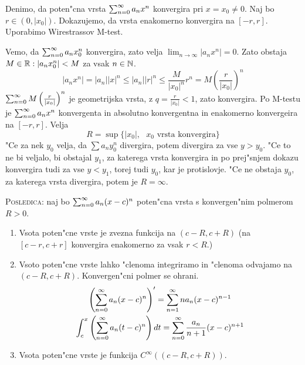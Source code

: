 Denimo, da poten"cna vrsta $\sum_{n = 0}^{\infty} a_n x^n$ konvergira pri $x = x_0 \neq 0$. Naj bo $r \in (0, |x_0|)$. Dokazujemo, da vrsta enakomerno konvergira na $[-r, r]$. Uporabimo Wirestrassov M-test.

Vemo, da $\sum_{n = 0}^{\infty}a_n x_0^n$ konvergira, zato velja $\lim_{n \to \infty} |a_n x^n| = 0$. Zato obstaja $M \in \mathbb{R}: |a_n x_0^n| < M$ za vsak $n \in \mathbb{N}$.
\begin{equation*}
|a_n x^n| = |a_n| |x|^n \leq |a_n| |r|^n \leq \dfrac{M}{|x_0|^n} r^n = M \left( \dfrac{r}{|x_0|} \right)^n
\end{equation*}
$\sum_{n = 0}^{\infty} M \left( \frac{r}{|x_0|} \right)^n$ je geometrijska vrsta, z $q = \frac{r}{|x_0|} < 1$, zato konvergira. Po M-testu je $\sum_{n = 0}^{\infty} a_n x^n$ konvergenta in absolutno konvergentna in enakomerno konvergeira na $[-r, r]$. Velja
\begin{equation*}
R = \sup \{ |x_0|, \text{ $x_0$ vrsta konvergira} \}
\end{equation*}
"Ce za nek $y_0$ velja, da $\sum a_n y_0^n$ divergira, potem divergira za vse $y > y_0$. "Ce to ne bi veljalo, bi obstajal $y_1$,  za katerega vrsta konvergira in po prej"snjem dokazu konvergira tudi za vse $y < y_1$, torej tudi $y_0$, kar je protislovje. "Ce ne obstaja $y_0$, za katerega vrsta divergira, potem je $R = \infty$.

\textsc{Posledica:} naj bo $\sum_{n = 0}^{\infty} a_n (x - c)^n$ poten"cna vrsta s konvergen"nim polmerom $R > 0$.
\begin{enumerate}
    \item Vsota poten"cne vrste je zvezna funkcija na $(c - R, c + R)$ (na $[c-r, c+r]$ konvergira enakomerno za vsak $r < R$.)
    \item Vsoto poten"cne vrste lahko "clenoma integriramo in "clenoma odvajamo na $(c-R, c+R)$. Konvergen"cni polmer se ohrani.
    \begin{gather*}
     \left( \sum_{n = 0}^{\infty} a_n (x - c)^n \right)' = \sum_{n = 1}^{\infty} n a_n (x - c)^{n-1} \\
     \int_c^x \left( \sum_{n = 0}^{\infty} a_n (t - c)^n \right)dt = \sum_{n = 0}^{\infty} \dfrac{a_n}{n+1} (x-c)^{n+1}
    \end{gather*}
    \item Vsota poten"cne vrste je funkcija $C^\infty ((c-R, c+R))$.
\end{enumerate}

